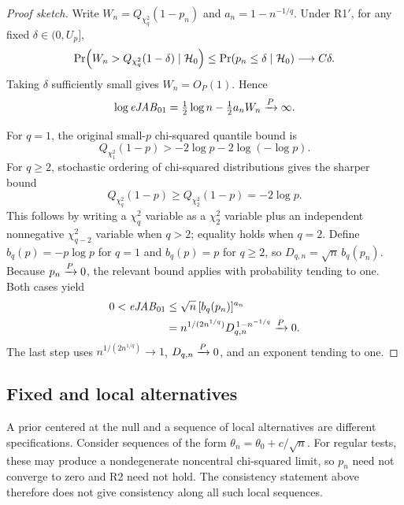 \documentclass[11pt,letterpaper]{article}
\begin{document}
\begin{proof}[Proof sketch]
Write \(W_n=Q_{\chi_q^2}(1-p_n)\) and \(a_n=1-n^{-1/q}\).
Under R1$'$, for any fixed \(\delta\in(0,U_p]\),
\[
 \Pr\!\left(W_n>Q_{\chi_q^2}(1-\delta)\mid\mathcal H_0\right)
 \leq\Pr(p_n\leq\delta\mid\mathcal H_0)\longrightarrow C\delta.
\]
Taking \(\delta\) sufficiently small gives \(W_n=O_P(1)\). Hence
\begin{equation}
 \log\mathit{eJAB}_{01}=\tfrac12\log n-\tfrac12 a_n W_n
 \xrightarrow{P}\infty .
 \label{eq:null-proof}
\end{equation}

For \(q=1\), the original small-\(p\) chi-squared quantile bound is
\begin{equation}
 Q_{\chi_1^2}(1-p)>
 -2\log p-2\log(-\log p).
 \label{eq:tail-bound}
\end{equation}
For \(q\geq2\), stochastic ordering of chi-squared distributions gives
the sharper bound
\begin{equation}
 Q_{\chi_q^2}(1-p)\geq Q_{\chi_2^2}(1-p)=-2\log p.
 \label{eq:tail-bound-multidimensional}
\end{equation}
This follows by writing a \(\chi_q^2\) variable as a \(\chi_2^2\)
variable plus an independent nonnegative \(\chi_{q-2}^2\) variable
when \(q>2\); equality holds when \(q=2\).
Define \(b_q(p)=-p\log p\) for \(q=1\) and \(b_q(p)=p\) for
\(q\geq2\), so \(D_{q,n}=\sqrt n\,b_q(p_n)\).
Because \(p_n\xrightarrow{P}0\), the relevant bound applies with probability
tending to one. Both cases yield
\begin{align}
 0<\mathit{eJAB}_{01}
 &\leq \sqrt n\,[b_q(p_n)]^{a_n}\nonumber\\
 &=n^{1/(2n^{1/q})}D_{q,n}^{\,1-n^{-1/q}}\xrightarrow{P}0 .
 \label{eq:alternative-proof}
\end{align}
The last step uses \(n^{1/(2n^{1/q})}\to1\), \(D_{q,n}\xrightarrow{P}0\), and an
exponent tending to one.
\end{proof}

\subsection{Fixed and local alternatives}
A prior centered at the null and a sequence of local alternatives are
different specifications. Consider sequences of the form
\(\theta_n=\theta_0+c/\sqrt n\). For regular tests, these may
produce a nondegenerate noncentral chi-squared limit, so \(p_n\) need not
converge to zero and R2 need not hold. The consistency statement above
therefore does not give consistency along all such local sequences.
\end{document}
